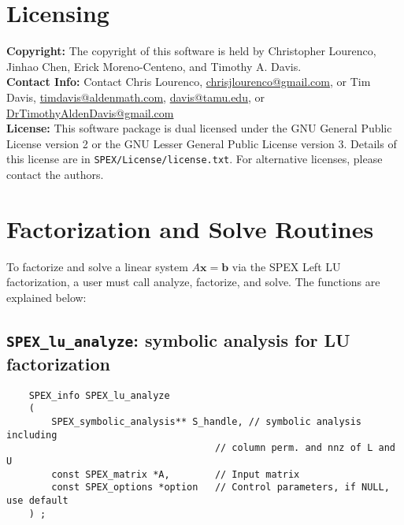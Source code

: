 \documentclass[12pt]{report}
\theoremstyle{definition}
\begin{document}
\section{Licensing} \label{s:LeftLU:licensing}

\textbf{Copyright:} The copyright of this software is held by  Christopher Lourenco, Jinhao Chen, Erick Moreno-Centeno, and Timothy A. Davis.\\

\noindent \textbf{Contact Info:} Contact Chris Lourenco,
\href{mailto:chrisjlourenco@gmail.com}{chrisjlourenco@gmail.com}, or Tim Davis,
\href{mailto:timdavis@aldenmath.com}{timdavis@aldenmath.com},
\href{mailto:davis@tamu.edu}{davis@tamu.edu}, or
\href{DrTimothyAldenDavis@gmail.com}{DrTimothyAldenDavis@gmail.com}\\

\noindent \textbf{License:} This software package is dual licensed under the GNU General Public License version 2 or the GNU Lesser General Public License version 3. Details of this license are in \verb|SPEX/License/license.txt|. For alternative licenses, please contact the authors.


\section{Factorization and Solve Routines}

To factorize and solve a linear system $A \mathbf{x} = \mathbf{b}$ via the SPEX Left LU factorization, a user must call analyze, factorize, and solve. The functions are explained below:

\subsection{\texttt{SPEX\_lu\_analyze}: symbolic analysis for LU factorization} \label{ss:spex_lu_analyze}

\begin{mdframed}[userdefinedwidth=6in]
{\footnotesize
\begin{verbatim}
    SPEX_info SPEX_lu_analyze
    (
        SPEX_symbolic_analysis** S_handle, // symbolic analysis including
                                     // column perm. and nnz of L and U
        const SPEX_matrix *A,        // Input matrix
        const SPEX_options *option   // Control parameters, if NULL, use default
    ) ;
\end{verbatim}
} \end{mdframed}
\end{document}
